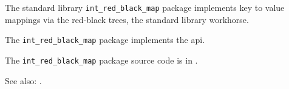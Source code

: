 
The standard library {\tt int\_red\_black\_map} package implements key 
to value mappings via the red-black trees, the standard library workhorse.

The {\tt int\_red\_black\_map} package implements the  api.

The {\tt int\_red\_black\_map} package source code is in .

See also:  .




